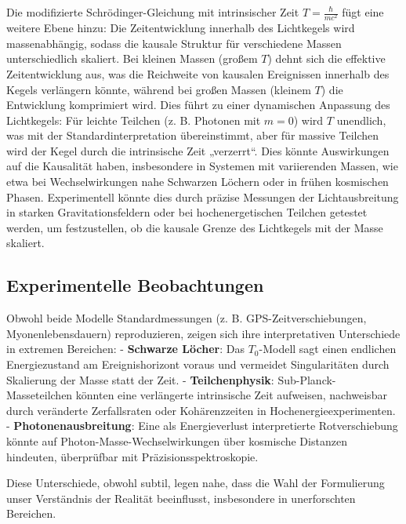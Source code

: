 \documentclass[a4paper,12pt]{article}
\begin{document}
	Die modifizierte Schrödinger-Gleichung mit intrinsischer Zeit \( T = \frac{\hbar}{m c^2} \) fügt eine weitere Ebene hinzu: Die Zeitentwicklung innerhalb des Lichtkegels wird massenabhängig, sodass die kausale Struktur für verschiedene Massen unterschiedlich skaliert. Bei kleinen Massen (großem \( T \)) dehnt sich die effektive Zeitentwicklung aus, was die Reichweite von kausalen Ereignissen innerhalb des Kegels verlängern könnte, während bei großen Massen (kleinem \( T \)) die Entwicklung komprimiert wird. Dies führt zu einer dynamischen Anpassung des Lichtkegels: Für leichte Teilchen (z. B. Photonen mit \( m = 0 \)) wird \( T \) unendlich, was mit der Standardinterpretation übereinstimmt, aber für massive Teilchen wird der Kegel durch die intrinsische Zeit „verzerrt“. Dies könnte Auswirkungen auf die Kausalität haben, insbesondere in Systemen mit variierenden Massen, wie etwa bei Wechselwirkungen nahe Schwarzen Löchern oder in frühen kosmischen Phasen. Experimentell könnte dies durch präzise Messungen der Lichtausbreitung in starken Gravitationsfeldern oder bei hochenergetischen Teilchen getestet werden, um festzustellen, ob die kausale Grenze des Lichtkegels mit der Masse skaliert.
	
	\subsection{Experimentelle Beobachtungen}
	Obwohl beide Modelle Standardmessungen (z. B. GPS-Zeitverschiebungen, Myonenlebensdauern) reproduzieren, zeigen sich ihre interpretativen Unterschiede in extremen Bereichen:
	- \textbf{Schwarze Löcher}: Das \( T_0 \)-Modell sagt einen endlichen Energiezustand am Ereignishorizont voraus und vermeidet Singularitäten durch Skalierung der Masse statt der Zeit.
	- \textbf{Teilchenphysik}: Sub-Planck-Masseteilchen könnten eine verlängerte intrinsische Zeit aufweisen, nachweisbar durch veränderte Zerfallsraten oder Kohärenzzeiten in Hochenergieexperimenten.
	- \textbf{Photonenausbreitung}: Eine als Energieverlust interpretierte Rotverschiebung könnte auf Photon-Masse-Wechselwirkungen über kosmische Distanzen hindeuten, überprüfbar mit Präzisionsspektroskopie.
	
	Diese Unterschiede, obwohl subtil, legen nahe, dass die Wahl der Formulierung unser Verständnis der Realität beeinflusst, insbesondere in unerforschten Bereichen.
	
\end{document}
